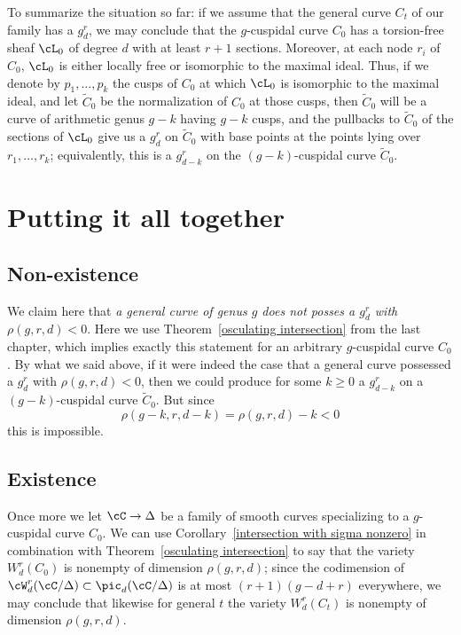 To summarize the situation so far: if we assume that the general curve $C_t$ of our family has a $g^r_d$, we may conclude that the $g$-cuspidal curve $C_0$ has a torsion-free sheaf $\cL_0$ of degree $d$ with at least $r+1$ sections. 
Moreover, at each node $r_i$ of $C_0$, $\cL_0$ is either locally free or isomorphic to the maximal ideal. Thus, if we denote by $p_1,\dots, p_k$ the cusps of $C_0$ at which $\cL_0$ is isomorphic to the maximal ideal, and let $\widetilde C_0$ be the normalization of $C_0$ at those cusps, then $\widetilde C_0$ will be a curve of arithmetic genus $g-k$ having $g-k$ cusps, and
the pullbacks to $\widetilde C_0$ of the sections of $\cL_0$ give us a $g^r_d$ on $\widetilde C_0$ with base points at the points lying over $r_1,\dots,r_k$; equivalently, this is a $g^r_{d-k}$ on the $(g-k)$-cuspidal curve  $\widetilde C_0$.



\section{Putting it all together}

\subsection{Non-existence}

We claim here that \emph{a general curve of genus $g$ does not posses a $g^r_d$ with $\rho(g,r,d) < 0$}.
Here we use Theorem~\ref{osculating intersection} from the last chapter, which implies exactly this statement for an arbitrary $g$-cuspidal curve $C_0$. By what we said above, if it were indeed the case that a general curve possessed a $g^r_d$ with $\rho(g,r,d) < 0$, then we could produce for some $k \geq 0$ a $g^r_{d-k}$ on a $(g-k)$-cuspidal curve  $\widetilde C_0$. But since
$$
\rho(g-k, r, d-k) = \rho(g,r,d) - k < 0
$$
this is impossible.

\subsection{Existence}

Once more we let $\cC \to \Delta$ be a family of smooth curves specializing to a $g$-cuspidal curve $C_0$. We can use Corollary~\ref{intersection with sigma nonzero} in combination with Theorem~\ref{osculating intersection} to say that the variety $W^r_d(C_0)$ is nonempty of dimension $\rho(g,r,d)$; since the codimension of $\cW^r_d(\cC/\Delta) \subset \pic_d(\cC/\Delta)$ is at most $(r+1)(g-d+r)$ everywhere, we may conclude that likewise for general $t$ the variety $W^r_d(C_t)$ is nonempty of dimension $\rho(g,r,d)$.

